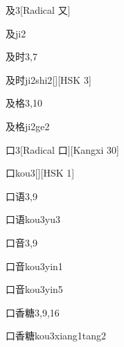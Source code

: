 \begin{entry}{及}{3}[Radical 又]
  \begin{phonetics}{及}{ji2}
  \end{phonetics}
\end{entry}

\begin{entry}{及时}{3,7}
  \begin{phonetics}{及时}{ji2shi2}[][HSK 3]
  \end{phonetics}
\end{entry}

\begin{entry}{及格}{3,10}
  \begin{phonetics}{及格}{ji2ge2}
  \end{phonetics}
\end{entry}

\begin{entry}{口}{3}[Radical 口][Kangxi 30]
  \begin{phonetics}{口}{kou3}[][HSK 1]
  \end{phonetics}
\end{entry}

\begin{entry}{口语}{3,9}
  \begin{phonetics}{口语}{kou3yu3}
  \end{phonetics}
\end{entry}

\begin{entry}{口音}{3,9}
  \begin{phonetics}{口音}{kou3yin1}
  \end{phonetics}
  \begin{phonetics}{口音}{kou3yin5}
  \end{phonetics}
\end{entry}

\begin{entry}{口香糖}{3,9,16}
  \begin{phonetics}{口香糖}{kou3xiang1tang2}
  \end{phonetics}
\end{entry}

